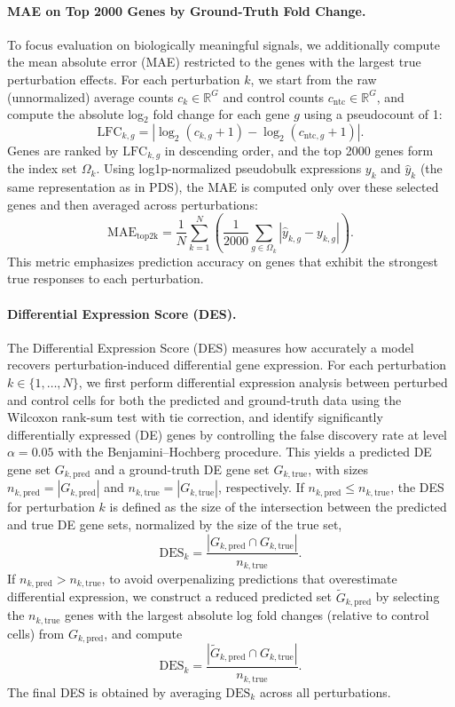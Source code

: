 \documentclass[conference]{IEEEtran}
\begin{document}
\paragraph{MAE on Top 2000 Genes by Ground-Truth Fold Change.}
To focus evaluation on biologically meaningful signals, we additionally compute the mean absolute error (MAE) restricted to the genes with the largest true perturbation effects. For each perturbation $k$, we start from the raw (unnormalized) average counts $c_k \in \mathbb{R}^G$ and control counts $c_{\mathrm{ntc}} \in \mathbb{R}^G$, and compute the absolute log$_2$ fold change for each gene $g$ using a pseudocount of 1:
\[
\mathrm{LFC}_{k,g} = \left|\log_2(c_{k,g} + 1) - \log_2(c_{\mathrm{ntc},g} + 1)\right|.
\]
Genes are ranked by $\mathrm{LFC}_{k,g}$ in descending order, and the top 2000 genes form the index set $\Omega_k$. Using log1p-normalized pseudobulk expressions $y_k$ and $\hat y_k$ (the same representation as in PDS), the MAE is computed only over these selected genes and then averaged across perturbations:
\[
\mathrm{MAE}_{\mathrm{top2k}}
=
\frac{1}{N}
\sum_{k=1}^N
\left(
\frac{1}{2000}
\sum_{g \in \Omega_k}
\left|\hat y_{k,g} - y_{k,g}\right|
\right).
\]
This metric emphasizes prediction accuracy on genes that exhibit the strongest true responses to each perturbation.

\paragraph{Differential Expression Score (DES).}
The Differential Expression Score (DES) measures how accurately a model recovers perturbation-induced differential gene expression. For each perturbation $k \in \{1,\dots,N\}$, we first perform differential expression analysis between perturbed and control cells for both the predicted and ground-truth data using the Wilcoxon rank-sum test with tie correction, and identify significantly differentially expressed (DE) genes by controlling the false discovery rate at level $\alpha = 0.05$ with the Benjamini--Hochberg procedure. This yields a predicted DE gene set $G_{k,\mathrm{pred}}$ and a ground-truth DE gene set $G_{k,\mathrm{true}}$, with sizes $n_{k,\mathrm{pred}} = |G_{k,\mathrm{pred}}|$ and $n_{k,\mathrm{true}} = |G_{k,\mathrm{true}}|$, respectively. If $n_{k,\mathrm{pred}} \le n_{k,\mathrm{true}}$, the DES for perturbation $k$ is defined as the size of the intersection between the predicted and true DE gene sets, normalized by the size of the true set,
\[
\mathrm{DES}_k = \frac{|G_{k,\mathrm{pred}} \cap G_{k,\mathrm{true}}|}{n_{k,\mathrm{true}}}.
\]
If $n_{k,\mathrm{pred}} > n_{k,\mathrm{true}}$, to avoid overpenalizing predictions that overestimate differential expression, we construct a reduced predicted set $\tilde G_{k,\mathrm{pred}}$ by selecting the $n_{k,\mathrm{true}}$ genes with the largest absolute log fold changes (relative to control cells) from $G_{k,\mathrm{pred}}$, and compute
\[
\mathrm{DES}_k = \frac{|\tilde G_{k,\mathrm{pred}} \cap G_{k,\mathrm{true}}|}{n_{k,\mathrm{true}}}.
\]
The final DES is obtained by averaging $\mathrm{DES}_k$ across all perturbations.
\end{document}
